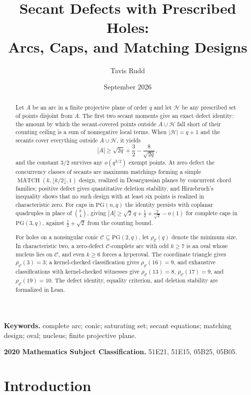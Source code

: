 \documentclass[11pt]{article}
\title{Secant Defects with Prescribed Holes:\\
Arcs, Caps, and Matching Designs}
\author{Tavis Rudd}
\date{September 2026}
\theoremstyle{definition}
\theoremstyle{remark}
\newcommand{\PG}{\mathrm{PG}}
\newcommand{\cC}{\mathcal{C}}
\newcommand{\cH}{\mathcal{H}}
\newcommand{\rhoC}{\rho_{\cC}}
\begin{document}
\maketitle

\begin{abstract}
Let \(A\) be an arc in a finite projective plane of order \(q\) and let
\(\cH\) be any prescribed set of points disjoint from \(A\).  The first two
secant moments give an exact defect identity: the amount by which the
secant-covered points outside \(A\cup\cH\) fall short of their counting
ceiling is a sum of nonnegative local terms.  When
\(|\cH|=q+1\) and the secants cover everything outside \(A\cup\cH\), it
yields
\[
 |A|\ge \sqrt{2q}+\frac32-\frac8{\sqrt{2q}},
\]
and the constant \(3/2\) survives any \(o(q^{3/2})\) exempt points.  At zero
defect the concurrency classes of secants are maximum matchings forming a
simple \(\operatorname{MATCH}(k,\lfloor k/2\rfloor,1)\) design, realized in
Desarguesian planes by concurrent chord families; positive defect gives
quantitative deletion stability, and Hirzebruch's inequality shows that no
such design with at least six points is realized in characteristic zero.
For caps in \(\PG(n,q)\) the identity persists with coplanar quadruples in
place of \(\binom{k}{4}\), giving
\(|A|\ge\sqrt2\,q+\frac12+\frac3{\sqrt2}-o(1)\) for complete caps in
\(\PG(3,q)\), against \(\frac12+\sqrt2\) from the counting bound.

For holes on a nonsingular conic \(\cC\subseteq\PG(2,q)\), let \(\rhoC(q)\)
denote the minimum size.  In characteristic two, a zero-defect
\(\cC\)-complete arc with odd \(k\ge7\) is an oval whose nucleus lies on
\(\cC\), and even \(k\ge6\) forces a hyperoval.  The coordinate triangle
gives \(\rhoC(3)=3\); a kernel-checked classification gives \(\rhoC(16)=9\),
and exhaustive classifications with kernel-checked witnesses give
\(\rhoC(13)=8\), \(\rhoC(17)=9\), and \(\rhoC(19)=10\).  The defect
identity, equality criterion, and deletion stability are formalized in Lean.
\end{abstract}

\noindent\textbf{Keywords.} complete arc; conic; saturating set; secant
equations; matching design; oval; nucleus; finite projective plane.

\smallskip
\noindent\textbf{2020 Mathematics Subject Classification.} 51E21, 51E15,
05B25, 05B05.

\section{Introduction}
\end{document}
